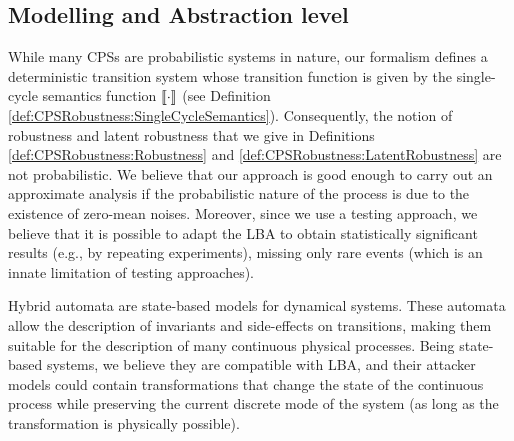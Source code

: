 {\subsection{Modelling and Abstraction level}
While many CPSs are probabilistic systems in nature, our formalism defines a deterministic transition system whose transition function is given by the single-cycle semantics function ${{{\llbracket\cdot\rrbracket}}}$ (see Definition \ref{def:CPSRobustness:SingleCycleSemantics}). Consequently, the notion of robustness and latent robustness that we give in Definitions \ref{def:CPSRobustness:Robustness} and \ref{def:CPSRobustness:LatentRobustness} are not probabilistic. We believe that our approach is good enough to carry out an approximate analysis if the probabilistic nature of the process is due to the existence of zero-mean noises. Moreover, since we use a testing approach, we believe that it is possible to adapt the LBA to obtain statistically significant results (e.g., by repeating experiments), missing only rare events (which is an innate limitation of testing approaches).

{Hybrid automata} \cite{ALUR19953} are state-based models for dynamical systems. These automata allow the description of invariants and side-effects on transitions, making them suitable for the description of many continuous physical processes. Being state-based systems, we believe they are compatible with LBA, and their attacker models could contain transformations that change the state of the continuous process while preserving the current discrete mode of the system (as long as the transformation is physically possible). %


}
